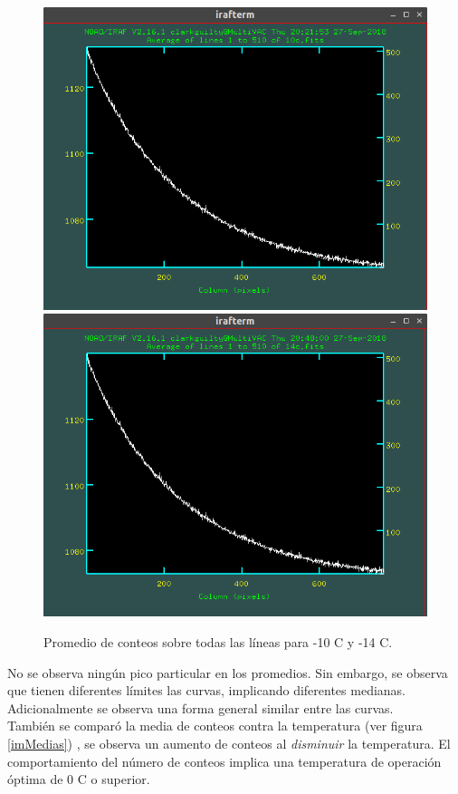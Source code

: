\documentclass[12pt]{article}
\begin{document}
\begin{figure}[H]
   \includegraphics[scale=0.4]{10c.png}
   \includegraphics[scale=0.4]{14c.png}
  \caption{Promedio de conteos sobre todas las líneas para -10 \degree C y -14 \degree C. }
  \label{im1}
\end{figure}
No se observa ningún pico particular en los promedios. Sin embargo, se observa que tienen diferentes límites las curvas, implicando diferentes medianas. Adicionalmente  se observa una forma general similar entre las curvas.\\

También se comparó la media de conteos contra la temperatura (ver figura \ref{imMedias}) , se observa un aumento de conteos al \emph{disminuir} la temperatura. El comportamiento del número de conteos implica una temperatura de operación óptima de 0 \degree C o superior.
\end{document}
